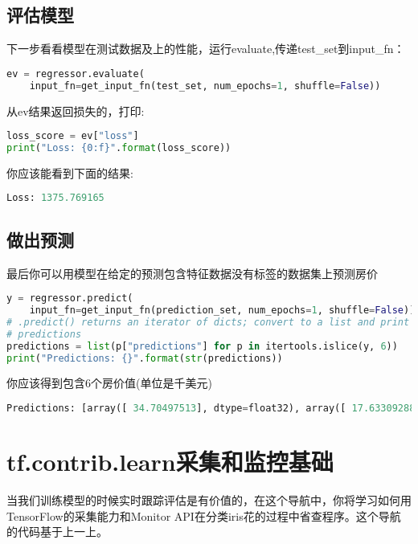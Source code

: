 \subsection{评估模型}
下一步看看模型在测试数据及上的性能，运行evaluate,传递test\_set到input\_fn：
\begin{lstlisting}[language=Python]
ev = regressor.evaluate(
    input_fn=get_input_fn(test_set, num_epochs=1, shuffle=False))
\end{lstlisting}
从ev结果返回损失的，打印:
\begin{lstlisting}[language=Python]
loss_score = ev["loss"]
print("Loss: {0:f}".format(loss_score))
\end{lstlisting}
你应该能看到下面的结果:
\begin{lstlisting}[language=Python]
Loss: 1375.769165
\end{lstlisting}
\subsection{做出预测}
最后你可以用模型在给定的预测包含特征数据没有标签的数据集上预测房价
\begin{lstlisting}[language=Python]
y = regressor.predict(
    input_fn=get_input_fn(prediction_set, num_epochs=1, shuffle=False))
# .predict() returns an iterator of dicts; convert to a list and print
# predictions
predictions = list(p["predictions"] for p in itertools.islice(y, 6))
print("Predictions: {}".format(str(predictions))
\end{lstlisting}
你应该得到包含6个房价值(单位是千美元)
\begin{lstlisting}[language=Python]
Predictions: [array([ 34.70497513], dtype=float32), array([ 17.63309288], dtype=float32), array([ 23.71421814], dtype=float32), array([ 35.60274506], dtype=float32), array([ 15.12172413], dtype=float32), array([ 19.79147911], dtype=float32)]
\end{lstlisting}
\section{tf.contrib.learn采集和监控基础}
当我们训练模型的时候实时跟踪评估是有价值的，在这个导航中，你将学习如何用TensorFlow的采集能力和Monitor API在分类iris花的过程中省查程序。这个导航的代码基于上一上。
